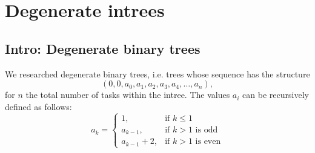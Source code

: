 


\section{Degenerate intrees}
\label{sec:p3-degenerate-intrees}


\subsection{Intro: Degenerate binary trees}
\label{sec:p3-degenerate-trees-binary}

We researched degenerate binary trees, i.e. trees whose sequence has the structure
\begin{equation*}
  \left( 0,0,a_0,a_1,a_2,a_3,a_4,\dots,a_n \right),
\end{equation*}
for $n$ the total number of tasks within the intree. The values $a_i$ can be recursively defined as follows:
\begin{equation*}
  a_k =
  \begin{cases}
    1, & \text{if } k\leq 1 \\
    a_{k-1}, & \text{if } k>1 \text{ is odd} \\
    a_{k-1}+2, & \text{if } k>1 \text{ is even}
  \end{cases}
\end{equation*}

